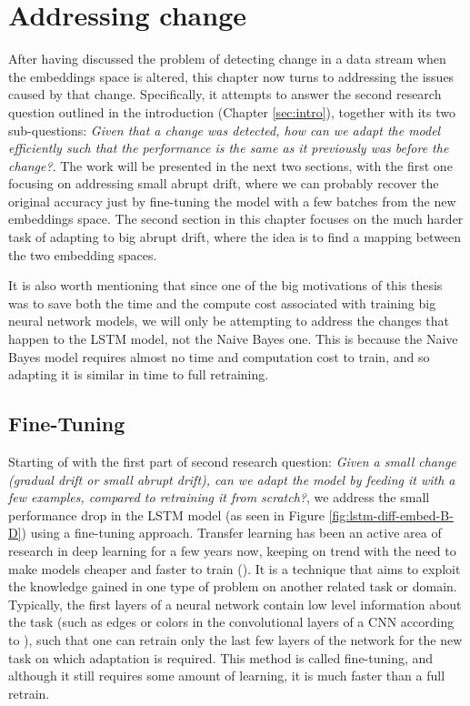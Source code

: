 \documentclass[12pt]{extreport}
\begin{document}
\chapter{Addressing change} \label{sec:addressing}

After having discussed the problem of detecting change in a data stream when the embeddings space is altered, this chapter now turns to addressing the issues caused by that change. Specifically, it attempts to answer the second research question outlined in the introduction (Chapter \ref{sec:intro}), together with its two sub-questions: \emph{Given that a change was detected, how can we adapt the model efficiently such that the performance is the same as it previously was before the change?}. The work will be presented in the next two sections, with the first one focusing on addressing small abrupt drift, where we can probably recover the original accuracy just by fine-tuning the model with a few batches from the new embeddings space. The second section in this chapter focuses on the much harder task of adapting to big abrupt drift, where the idea is to find a mapping between the two embedding spaces.

It is also worth mentioning that since one of the big motivations of this thesis was to save both the time and the compute cost associated with training big neural network models, we will only be attempting to address the changes that happen to the LSTM model, not the Naive Bayes one. This is because the Naive Bayes model requires almost no time and computation cost to train, and so adapting it is similar in time to full retraining.

\section{Fine-Tuning} \label{sec:fine}

Starting of with the first part of second research question: \emph{Given a small change (gradual drift or small abrupt drift), can we adapt the model by feeding it with a few examples, compared to retraining it from scratch?}, we address the small performance drop in the LSTM model (as seen in Figure \ref{fig:lstm-diff-embed-B-D}) using a fine-tuning approach. Transfer learning has been an active area of research in deep learning for a few years now, keeping on trend with the need to make models cheaper and faster to train (\cite{survey-transfer-learning}). It is a technique that aims to exploit the knowledge gained in one type of problem on another related task or domain. Typically, the first layers of a neural network contain low level information about the task (such as edges or colors in the convolutional layers of a CNN according to \cite{survey-transfer-learning}), such that one can retrain only the last few layers of the network for the new task on which adaptation is required. This method is called fine-tuning, and although it still requires some amount of learning, it is much faster than a full retrain.
\end{document}
